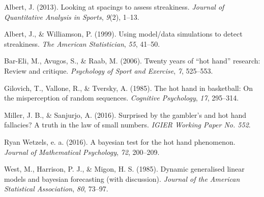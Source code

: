 \documentclass[12pt,twoside]{dukestatscithesis}
\theoremstyle{definition}
\theoremstyle{definition}
\theoremstyle{definition}
\theoremstyle{remark}
\begin{document}
\hypertarget{ref-albert13}{}
Albert, J. (2013). Looking at spacings to assess streakiness.
\emph{Journal of Quantitative Analysis in Sports}, \emph{9}(2), 1--13.

\hypertarget{ref-albert99}{}
Albert, J., \& Williamson, P. (1999). Using model/data simulations to
detect streakiness. \emph{The American Statistician}, \emph{55}, 41--50.

\hypertarget{ref-bareli06}{}
Bar-Eli, M., Avugos, S., \& Raab, M. (2006). Twenty years of ``hot
hand'' research: Review and critique. \emph{Psychology of Sport and
Exercise}, \emph{7}, 525--553.

\hypertarget{ref-gilovich85}{}
Gilovich, T., Vallone, R., \& Tversky, A. (1985). The hot hand in
basketball: On the misperception of random sequences. \emph{Cognitive
Psychology}, \emph{17}, 295--314.

\hypertarget{ref-miller16}{}
Miller, J. B., \& Sanjurjo, A. (2016). Surprised by the gambler's and
hot hand fallacies? A truth in the law of small numbers. \emph{IGIER
Working Paper No. 552}.

\hypertarget{ref-wetzels16}{}
Ryan Wetzels, e. a. (2016). A bayesian test for the hot hand phenomenon.
\emph{Journal of Mathematical Psychology}, \emph{72}, 200--209.

\hypertarget{ref-west85}{}
West, M., Harrison, P. J., \& Migon, H. S. (1985). Dynamic generalised
linear models and bayesian forecasting (with discussion). \emph{Journal
of the American Statistical Association}, \emph{80}, 73--97.


\end{document}
